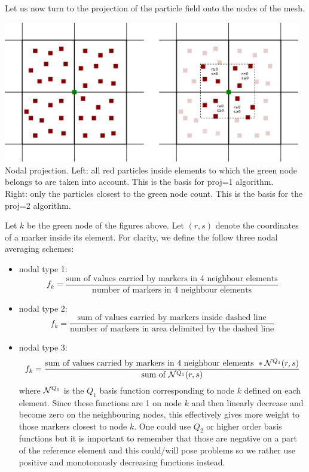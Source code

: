 Let us now turn to the projection of the particle field onto the nodes of the mesh.

\begin{center}
\includegraphics[width=13cm]{python_codes/fieldstone_13/images/markers2}\\
{\captionfont Nodal projection. 
Left: all red particles inside elements to which the green node belongs to are taken into account.
This is the basis for proj=1 algorithm.\\
Right: only the particles closest to the green node count. This is the basis for the proj=2
algorithm.}
\end{center}

Let $k$ be the green node of the figures above. Let $(r,s)$ 
denote the coordinates of a marker inside its element.
For clarity, we define the follow three nodal averaging schemes:
\begin{itemize}
\item nodal type 1: 
\[
f_k = \frac{\text{sum of values carried by markers in 4 neighbour elements}}
{\text{number of markers in 4 neighbour elements}}
\]
\item nodal type 2: 
\[
f_k = \frac{\text{sum of values carried by markers inside dashed line}}
{\text{number of markers in area delimited by the dashed line}}
\]
\item nodal type 3: 
\[
f_k = \frac{\text{sum of values carried by markers in 4 neighbour elements } * {\mathcal{N}}^{Q_1}(r,s)}
{\text{sum of }{\mathcal{N}}^{Q_1}(r,s)} 
\]
where ${\mathcal{N}}^{Q_1}$ is the $Q_1$ basis function corresponding to node $k$ 
defined on each element. Since these 
functions are 1 on node $k$ and then linearly decrease and become zero on 
the neighbouring nodes, this
effectively gives more weight to those markers closest to node $k$.
One could use $Q_2$ or higher order basis functions but it is important 
to remember that those are negative on a part of the reference element
and this could/will pose problems so we rather use positive and monotonously 
decreasing functions instead.
\end{itemize}

